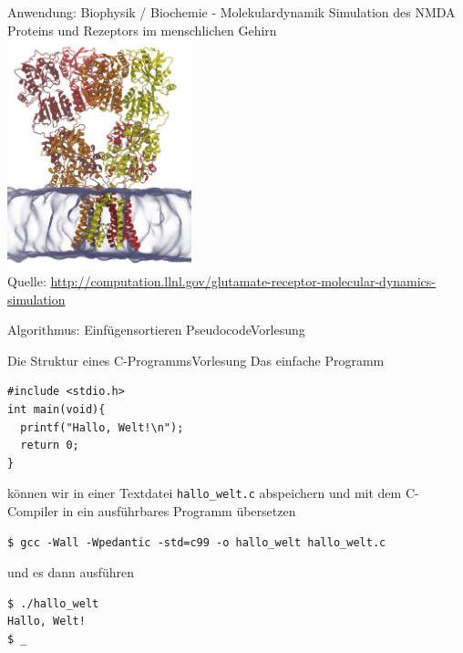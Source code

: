 \documentclass[xcolor=dvipsnames]{beamer}
\newcounter{lecturecounter}
\begin{document}
\begin{frame}{Anwendung: Biophysik / Biochemie - Molekulardynamik}
  \centering
  Simulation des NMDA Proteins und Rezeptors im menschlichen Gehirn\\ \vspace{0.2cm}
  \includegraphics[width=0.4\textwidth]{graphics/glutamate.jpg}\\
  {\small Quelle: \url{http://computation.llnl.gov/glutamate-receptor-molecular-dynamics-simulation} }
\end{frame}

\begin{frame}{Algorithmus: Einfügensortieren Pseudocode}{Vorlesung }
  
\end{frame}

\begin{frame}[fragile]{Die Struktur eines C-Programms}{Vorlesung }
Das einfache Programm
\begin{lstlisting}
#include <stdio.h>
int main(void){
  printf("Hallo, Welt!\n");
  return 0;
}
\end{lstlisting}
können wir in einer Textdatei \verb|hallo_welt.c| abspeichern und mit dem C-Compiler in ein ausführbares Programm übersetzen
\begin{verbatim}
$ gcc -Wall -Wpedantic -std=c99 -o hallo_welt hallo_welt.c
\end{verbatim}
und es dann ausführen
\begin{verbatim}
$ ./hallo_welt
Hallo, Welt!
$ _
\end{verbatim}
\end{frame}
\end{document}
